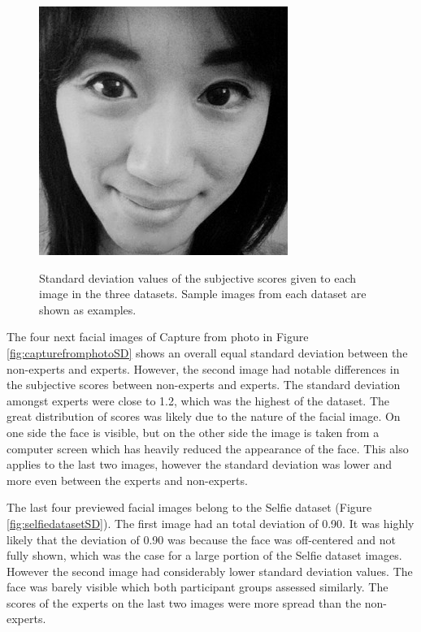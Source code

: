 \begin{figure}[H]
    \subfloat
        {\includegraphics[scale = 0.1]{figures/271.jpg}\hspace{1cm}}
    \quad
    \addtocounter{subfigure}{-4}
     \caption{Standard deviation values of the subjective scores given to each image in the three datasets. Sample images from each dataset are shown as examples.}
     \label{fig:MobaiDS}
\end{figure}

The four next facial images of Capture from photo in Figure \ref{fig:capturefromphotoSD} shows an overall equal standard deviation between the non-experts and experts. However, the second image had notable differences in the subjective scores between non-experts and experts. The standard deviation amongst experts were close to 1.2, which was the highest of the dataset. The great distribution of scores was likely due to the nature of the facial image. On one side the face is visible, but on the other side the image is taken from a computer screen which has heavily reduced the appearance of the face. This also applies to the last two images, however the standard deviation was lower and more even between the experts and non-experts.

The last four previewed facial images belong to the Selfie dataset (Figure \ref{fig:selfiedatasetSD}). The first image had an total deviation of 0.90. It was highly likely that the deviation of 0.90 was because the face was off-centered and not fully shown, which was the case for a large portion of the Selfie dataset images. However the second image had considerably lower standard deviation values. The face was barely visible which both participant groups assessed similarly. The scores of the experts on the last two images were more spread than the non-experts. 

